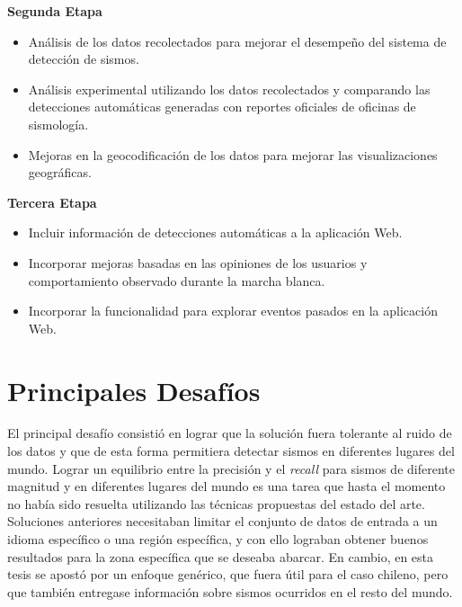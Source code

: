 \textbf{Segunda Etapa}

\begin{itemize}

\item Análisis de los datos recolectados para mejorar el desempeño del sistema de detección de sismos. 
\item Análisis experimental utilizando los datos recolectados y comparando las detecciones automáticas generadas con reportes oficiales de oficinas de sismología.
\item Mejoras en la geocodificación de los datos para mejorar las visualizaciones geográficas. 

\end{itemize}

\textbf{Tercera Etapa}

\begin{itemize}
\item Incluir información de detecciones automáticas a la aplicación Web.
\item Incorporar mejoras basadas en las opiniones de los usuarios y comportamiento observado durante la marcha blanca.
\item Incorporar la funcionalidad para explorar eventos pasados en la aplicación Web.

\end{itemize}

\section{Principales Desafíos}

El principal desafío consistió en lograr que la solución fuera tolerante al ruido de los datos y que de esta forma permitiera detectar sismos en diferentes lugares del mundo. 
%
Lograr un equilibrio entre la precisión y el {\em recall} para sismos de diferente magnitud y en diferentes lugares del mundo es una tarea que hasta el momento no había sido resuelta utilizando las técnicas propuestas del estado del arte. 
%
Soluciones anteriores necesitaban limitar el conjunto de datos de entrada a un idioma específico o una región específica, y con ello lograban obtener buenos resultados para la zona específica que se deseaba abarcar. 
%
En cambio, en esta tesis se apostó por un enfoque genérico, que fuera útil para el caso chileno, pero que también entregase información sobre sismos ocurridos en el resto del mundo.


